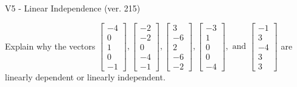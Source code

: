 \begin{exercise}
  \begin{exerciseTitle}V5 - Linear Independence (ver. 215)\end{exerciseTitle}
  \begin{exerciseStatement}
    Explain why the vectors \(\left[\begin{array}{r}
-4 \\
0 \\
1 \\
0 \\
-1
\end{array}\right] , \left[\begin{array}{r}
-2 \\
-2 \\
0 \\
-4 \\
-1
\end{array}\right] , \left[\begin{array}{r}
3 \\
-6 \\
2 \\
-6 \\
-2
\end{array}\right] , \left[\begin{array}{r}
-3 \\
1 \\
0 \\
0 \\
-4
\end{array}\right] , \text{ and } \left[\begin{array}{r}
-1 \\
3 \\
-4 \\
3 \\
3
\end{array}\right]\) are linearly dependent or linearly independent.	



\end{exerciseStatement}
\end{exercise}
